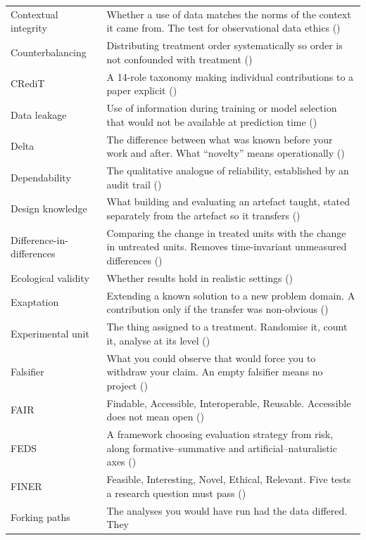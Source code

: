 \begin{center}
\begin{longtable}{@{}L{3.6cm}L{10.5cm}@{}}
Contextual integrity & Whether a use of data matches the norms of the context
  it came from. The test for observational data ethics () \\
Counterbalancing & Distributing treatment order systematically so order is not
  confounded with treatment () \\
CRediT & A 14-role taxonomy making individual contributions to a paper explicit
  () \\
Data leakage & Use of information during training or model selection that would
  not be available at prediction time () \\
Delta & The difference between what was known before your work and after. What
  ``novelty'' means operationally () \\
Dependability & The qualitative analogue of reliability, established by an
  audit trail () \\
Design knowledge & What building and evaluating an artefact taught, stated
  separately from the artefact so it transfers () \\
Difference-in-differences & Comparing the change in treated units with the
  change in untreated units. Removes time-invariant unmeasured differences
  () \\
Ecological validity & Whether results hold in realistic settings
  () \\
Exaptation & Extending a known solution to a new problem domain. A contribution
  only if the transfer was non-obvious () \\
Experimental unit & The thing assigned to a treatment. Randomise it, count it,
  analyse at its level () \\
Falsifier & What you could observe that would force you to withdraw your claim.
  An empty falsifier means no project () \\
FAIR & Findable, Accessible, Interoperable, Reusable. Accessible does not mean
  open () \\
FEDS & A framework choosing evaluation strategy from risk, along
  formative--summative and artificial--naturalistic axes
  () \\
FINER & Feasible, Interesting, Novel, Ethical, Relevant. Five tests a research
  question must pass () \\
Forking paths & The analyses you would have run had the data differed. They

\end{longtable}
\end{center}
